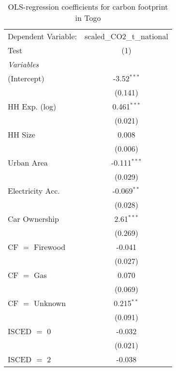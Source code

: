 
\begin{table}[htbp!]
   \centering
   \small
   \begin{adjustbox}{width = 1\textwidth, max height = 0.95\textheight, center}
      \begin{threeparttable}[b]
         \caption{\label{tab:OLS_2_TGO} OLS-regression coefficients for carbon footprint in Togo}
         \begin{tabular}{lc}
            \tabularnewline \midrule \midrule
            Dependent Variable: & scaled\_CO2\_t\_national\\     
            Test                & (1)\\  
            \midrule
            \emph{Variables}\\
            (Intercept)         & -3.52$^{***}$\\   
                                & (0.141)\\   
            HH Exp. (log)       & 0.461$^{***}$\\   
                                & (0.021)\\   
            HH Size             & 0.008\\   
                                & (0.006)\\   
            Urban Area          & -0.111$^{***}$\\   
                                & (0.029)\\   
            Electricity Acc.    & -0.069$^{**}$\\   
                                & (0.028)\\   
            Car Ownership       & 2.61$^{***}$\\   
                                & (0.269)\\   
            CF $=$ Firewood     & -0.041\\   
                                & (0.027)\\   
            CF $=$ Gas          & 0.070\\   
                                & (0.069)\\   
            CF $=$ Unknown      & 0.215$^{**}$\\   
                                & (0.091)\\   
            ISCED $=$ 0         & -0.032\\   
                                & (0.021)\\   
            ISCED $=$ 2         & -0.038\\   

\end{tabular}
\end{threeparttable}
\end{adjustbox}
\end{table}
